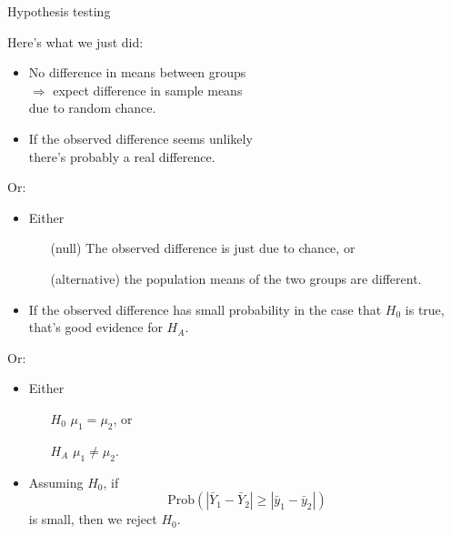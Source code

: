 \begin{frame}{Hypothesis testing}

    Here's what we just did:
    \begin{itemize}
        \item No difference in means between groups\\
            $\Rightarrow$ expect  difference in sample means\\
            due to random chance.
        \item If the observed difference \alert{seems unlikely} \\
            there's probably a real difference.
    \end{itemize}

     \vspace{2em}
     \pause

     Or:
     \begin{itemize}
         \item Either
             \begin{itemize}
                 \item[(null)] The observed difference is just due to chance, or
                 \item[(alternative)] the population means of the two groups are different.
             \end{itemize}
         \item If the observed difference has \alert{small probability}
             in the case that $H_0$ is true, that's good evidence for $H_A$.
     \end{itemize}

     \vspace{2em}
     \pause

     Or:
     \begin{itemize}
         \item Either
             \begin{itemize}
                 \item[$H_0$] $\mu_1 = \mu_2$, or
                 \item[$H_A$] $\mu_1 \neq \mu_2$.
             \end{itemize}
         \item Assuming $H_0$, if
             \[ \text{Prob}( |\bar Y_1 - \bar Y_2| \ge |\bar y_1 - \bar y_2| ) \]
             is small, then we \alert{reject} $H_0$.
     \end{itemize}

\end{frame}


